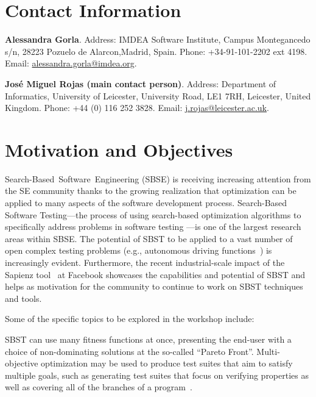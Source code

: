 \documentclass[10pt,conference]{IEEEtran}
\newcommand{\subheading}[1]{\vspace{1mm} \noindent {\bf #1}}
\begin{document}

\section{Contact Information}
\textbf{Alessandra Gorla}. Address: IMDEA Software Institute, Campus
Montegancedo s/n, 28223 Pozuelo de Alarcon,Madrid, Spain. Phone:
+34-91-101-2202 ext 4198. Email: \url{alessandra.gorla@imdea.org}.

\textbf{Jos\'e Miguel Rojas (main contact person)}. Address:
Department of Informatics, University of Leicester, University Road,
LE1 7RH, Leicester, United Kingdom. Phone: +44 (0) 116 252
3828. Email: \url{j.rojas@leicester.ac.uk}.

\section{Motivation and Objectives}
\label{sec:themes}
  
Search-Based~Software~Engineering (SBSE) \cite{mhbj:manifesto} is
receiving increasing attention from the SE community thanks to the
growing realization that optimization can be applied to many aspects
of the software development process.  Search-Based Software
Testing---the process of using search-based optimization algorithms to
specifically address problems in software testing
\cite{mcminn:survey}---is one of the largest research areas within
SBSE. The potential of SBST to be applied to a vast number of open
complex testing problems (e.g., autonomous driving
functions~\cite{Abdessalem2018}) is increasingly evident. Furthermore,
the recent industrial-scale impact of the Sapienz tool~\cite{Sapienz}
at Facebook%
showcases the capabilities and potential
of SBST and helps as motivation for the community to continue to work
on SBST techniques and tools.

\noindent Some of the specific topics to be explored in the workshop
include:
	
\subheading{Multi-Objective Solutions.}  SBST can use many fitness
functions at once, presenting the end-user with a choice of
non-dominating solutions at the so-called ``Pareto Front''.
Multi-objective optimization may be used to produce test suites that
aim to satisfy multiple goals, such as generating test suites that
focus on verifying properties as well as covering all of the branches
of a program~\cite{Gay14:risks}.
\end{document}
